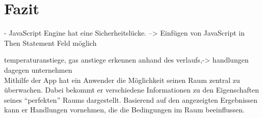 \chapter{Fazit}

- JavaScript Engine hat eine Sicherheitslücke. --> Einfügen von JavaScript in Then Statement Feld möglich

temperaturanstiege, gas anstiege erkennen anhand des verlaufs,-> handlungen dagegen unternehmen\\
Mithilfe der App hat ein Anwender die Möglichkeit seinen Raum zentral zu überwachen. Dabei bekommt er verschiedene Informationen zu den Eigenschaften seines \enquote{perfekten} Raums dargestellt. Basierend auf den angezeigten Ergebnissen kann er Handlungen vornehmen, die die Bedingungen im Raum beeinflussen. 